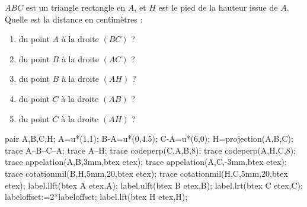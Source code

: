 \begin{exercice*}
   $ABC$ est un triangle rectangle en $A$, et $H$ est le pied de la hauteur issue de $A$. Quelle est la distance en centimètres :
   \begin{enumerate}
      \item du point $A$ à la droite $(BC)$ ?
      \item du point $B$ à la droite $(AC)$ ?
      \item du point $B$ à la droite $(AH)$ ?
      \item du point $C$ à la droite $(AB)$ ?
      \item du point $C$ à la droite $(AH)$ ?
   \end{enumerate}
   \begin{center}
      \begin{Geometrie}
         pair A,B,C,H;
         A=u*(1,1);
         B-A=u*(0,4.5);
         C-A=u*(6,0);
         H=projection(A,B,C);
         trace A--B--C--A;
         trace A--H;
         trace codeperp(C,A,B,8);
         trace codeperp(A,H,C,8);
         trace appelation(A,B,3mm,btex  etex);
         trace appelation(A,C,-3mm,btex  etex);
         trace cotationmil(B,H,5mm,20,btex  etex);
         trace cotationmil(H,C,5mm,20,btex  etex);
         label.llft(btex A etex,A);
         label.ulft(btex B etex,B);
         label.lrt(btex C etex,C);
         labeloffset:=2*labeloffset;
         label.lft(btex H etex,H);
      \end{Geometrie}
   \end{center}
\end{exercice*}
 
